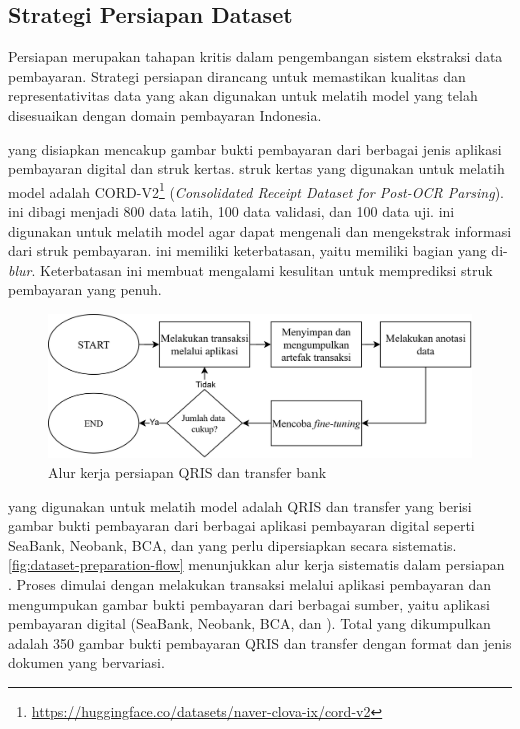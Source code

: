 \subsection{Strategi Persiapan Dataset}
\label{subsec:strategi-persiapan-dataset}

Persiapan \dataset{} merupakan tahapan kritis dalam pengembangan sistem ekstraksi data pembayaran. Strategi persiapan \dataset{} dirancang untuk memastikan kualitas dan representativitas data yang akan digunakan untuk melatih model \donut{} yang telah disesuaikan dengan domain pembayaran Indonesia.

\datasetfl{} yang disiapkan mencakup gambar bukti pembayaran dari berbagai jenis aplikasi pembayaran digital dan struk kertas. \datasetfl{} struk kertas yang digunakan untuk melatih model \donut{} adalah \dataset{} CORD-V2\footnote{\href{https://huggingface.co/datasets/naver-clova-ix/cord-v2}{https://huggingface.co/datasets/naver-clova-ix/cord-v2}} (\emph{Consolidated Receipt Dataset for Post-OCR Parsing}). \datasetfl{} ini dibagi menjadi 800 data latih, 100 data validasi, dan 100 data uji. \datasetfl{} ini digunakan untuk melatih model \donut{} agar dapat mengenali dan mengekstrak informasi dari struk pembayaran. \datasetfl{} ini memiliki keterbatasan, yaitu memiliki bagian yang di-\emph{blur}. Keterbatasan ini membuat \donut{} mengalami kesulitan untuk memprediksi struk pembayaran yang penuh.
\begin{figure}[htbp]
    \centering
    \includegraphics[width=1\textwidth]{images/dataset-preparation-flow.png}
    \caption{Alur kerja persiapan \dataset{} QRIS dan transfer bank}
    \label{fig:dataset-preparation-flow}
\end{figure}

\datasetfl{} yang digunakan untuk melatih model \donut{} adalah \dataset{} QRIS dan transfer yang berisi gambar bukti pembayaran dari berbagai aplikasi pembayaran digital seperti SeaBank, Neobank, BCA, dan \gopay{} yang perlu dipersiapkan secara sistematis. \autoref{fig:dataset-preparation-flow} menunjukkan alur kerja sistematis dalam persiapan \dataset. Proses dimulai dengan melakukan transaksi melalui aplikasi pembayaran dan mengumpukan gambar bukti pembayaran dari berbagai sumber, yaitu aplikasi pembayaran digital (SeaBank, Neobank, BCA, dan \gopay). Total \dataset{} yang dikumpulkan adalah 350 gambar bukti pembayaran QRIS dan transfer dengan format dan jenis dokumen yang bervariasi.

